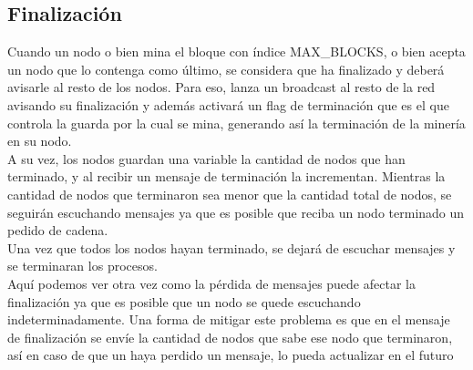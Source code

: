 \subsection{Finalización}
Cuando un nodo o bien mina el bloque con índice MAX_BLOCKS, o bien acepta un nodo que lo contenga como último, se considera que ha finalizado y deberá avisarle al resto de los nodos. Para eso, lanza un broadcast al resto de la red avisando su finalización y además activará un flag de terminación que es el que controla la guarda por la cual se mina, generando así la terminación de la minería en su nodo.
\\
A su vez, los nodos guardan una variable la cantidad de nodos que han terminado, y al recibir un mensaje de terminación la incrementan. Mientras la cantidad de nodos que terminaron sea menor que la cantidad total de nodos, se seguirán escuchando mensajes ya que es posible que reciba un nodo terminado un pedido de cadena.
\\
Una vez que todos los nodos hayan terminado, se dejará de escuchar mensajes y se terminaran los procesos.
\\
Aquí podemos ver otra vez como la pérdida de mensajes puede afectar la finalización ya que es posible que un nodo se quede escuchando indeterminadamente. Una forma de mitigar este problema es que en el mensaje de finalización se envíe la cantidad de nodos que sabe ese nodo que terminaron, así en caso de que un haya perdido un mensaje, lo pueda actualizar en el futuro

